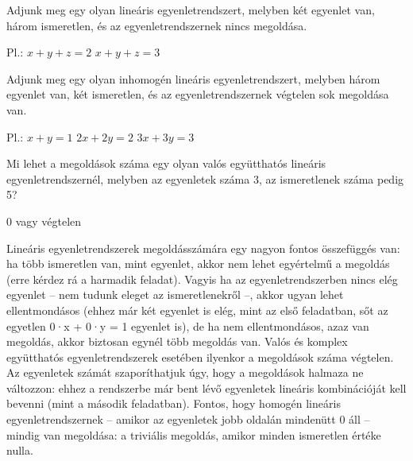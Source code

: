 \begin{frame}
  \begin{tcolorbox}[title={5/1. -N-}]
      Adjunk meg egy olyan lineáris egyenletrendszert, melyben két egyenlet van, három ismeretlen, és az egyenletrendszernek nincs megoldása.
  \tcblower

    \mmedskip 
    
    Pl.:
$x + y + z = 2$
$x + y + z = 3$
  \end{tcolorbox}
\end{frame}


\begin{frame}
  \begin{tcolorbox}[title={5/2. -N-}]
      Adjunk meg egy olyan inhomogén lineáris egyenletrendszert, melyben három egyenlet van, két ismeretlen, és az egyenletrendszernek végtelen sok megoldása van.
  \tcblower

    \mmedskip 
    
    Pl.:
$x + y = 1$
$2x + 2y = 2$
$3x + 3y = 3$

  \end{tcolorbox}
\end{frame}


\begin{frame}
  \begin{tcolorbox}[title={5/3. -N-}]
      Mi lehet a megoldások száma egy olyan valós együtthatós lineáris egyenletrendszernél, melyben az egyenletek száma 3, az ismeretlenek száma pedig 5?
  \tcblower

    \mmedskip 
    
    0 vagy végtelen
  \end{tcolorbox}
\end{frame}


\begin{frame}
  \begin{tcolorbox}[title={5/3. -N-}]
Lineáris egyenletrendszerek megoldásszámára egy nagyon fontos összefüggés van: ha több ismeretlen van, mint egyenlet, akkor nem lehet egyértelmű a megoldás (erre kérdez rá a harmadik feladat). Vagyis ha az egyenletrendszerben nincs elég egyenlet – nem tudunk eleget az ismeretlenekről –, akkor ugyan lehet ellentmondásos (ehhez már két egyenlet is elég, mint az első feladatban, sőt az egyetlen 0·x + 0·y = 1 egyenlet is), de ha nem ellentmondásos, azaz van megoldás, akkor biztosan egynél több megoldás van. Valós és komplex együtthatós egyenletrendszerek esetében ilyenkor a megoldások száma végtelen. Az egyenletek számát szaporíthatjuk úgy, hogy a megoldások halmaza ne változzon: ehhez a rendszerbe már bent lévő egyenletek lineáris kombinációját kell bevenni (mint a második feladatban). Fontos, hogy homogén lineáris egyenletrendszernek – amikor az egyenletek jobb oldalán mindenütt 0 áll – mindig van megoldása: a triviális megoldás, amikor minden ismeretlen értéke nulla.
  \end{tcolorbox}
\end{frame}



